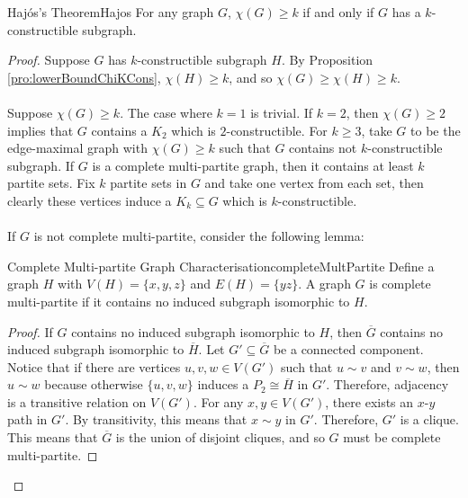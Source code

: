 \documentclass[math, code]{amznotes}
\theoremstyle{remark}
\begin{document}
\begin{thmbox}{Haj\'{o}s's Theorem}{Hajos}
    For any graph $G$, $\chi(G) \geq k$ if and only if $G$ has a $k$-constructible subgraph.
    \tcblower
    \begin{proof}
        Suppose $G$ has $k$-constructible subgraph $H$. By Proposition \ref{pro:lowerBoundChiKCons}, $\chi(H) \geq k$, and so $\chi(G) \geq \chi(H) \geq k$.
        \\\\
        Suppose $\chi(G) \geq k$. The case where $k = 1$ is trivial. If $k = 2$, then $\chi(G) \geq 2$ implies that $G$ contains a $K_2$ which is $2$-constructible. For $k \geq 3$, take $G$ to be the edge-maximal graph with $\chi(G) \geq k$ such that $G$ contains not $k$-constructible subgraph. If $G$ is a complete multi-partite graph, then it contains at least $k$ partite sets. Fix $k$ partite sets in $G$ and take one vertex from each set, then clearly these vertices induce a $K_k \subseteq G$ which is $k$-constructible.
        \\\\
        If $G$ is not complete multi-partite, consider the following lemma:
        \begin{lembox}{Complete Multi-partite Graph Characterisation}{completeMultPartite}
            Define a graph $H$ with $V(H) = \{x, y, z\}$ and $E(H) = \{yz\}$. A graph $G$ is complete multi-partite if it contains no induced subgraph isomorphic to $H$.
            \tcblower
            \begin{proof}
                If $G$ contains no induced subgraph isomorphic to $H$, then $\overline{G}$ contains no induced subgraph isomorphic to $\overline{H}$. Let $G' \subseteq \overline{G}$ be a connected component. Notice that if there are vertices $u, v, w \in V(G')$ such that $u \sim v$ and $v \sim w$, then $u \sim w$ because otherwise $\{u, v, w\}$ induces a $P_2 \cong \overline{H}$ in $G'$. Therefore, adjacency is a transitive relation on $V(G')$. For any $x, y \in V(G')$, there exists an $x$-$y$ path in $G'$. By transitivity, this means that $x \sim y$ in $G'$. Therefore, $G'$ is a clique. This means that $\overline{G}$ is the union of disjoint cliques, and so $G$ must be complete multi-partite.
            \end{proof}
        \end{lembox}

\end{proof}
\end{thmbox}
\end{document}
